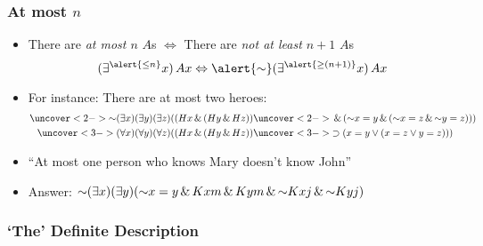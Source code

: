 \begin{frame}
    \frametitle{At most $n$}

\begin{itemize}
\item<1-> There are \emph{at most $n$} $A$s $\Leftrightarrow$ There are
\emph{not at least $n+1$} $A$s
\[
\qt{\exists^{\alert{\le n}}}{x}\, A\qv{x} \Leftrightarrow \alert{\lnot} \qt{\exists^{\alert{\ge(n+1)}}}{x} \, A\qv{x}
\]
\item<2-> For instance: There are at most two heroes:
\begin{align*}
\uncover<2->{\lnot \qt{\exists}{x}\qt{\exists}{y}\qt{\exists}{z}((H\qv{x} \land (H\qv{y} \land H\qv{z}))}
& \uncover<2->{\land (\lnot x =y \land (\lnot x = z \land \lnot y = z)) )}\\
\uncover<3->{\qt{\forall}{x}\qt{\forall}{y}\qt{\forall}{z}((H\qv{x} \land (H\qv{y} \land H\qv{z}))
} &\uncover<3->{\eif (x =y \lor ( x = z \lor y = z)) )}
\end{align*}


\item ``At most one person who knows Mary doesn't know John''

\item[] Answer: $\enot \qt{\exists}{x}\qt{\exists}{y}(\enot x = y \eand Kxm \eand Kym \eand \enot Kxj \eand \enot Kyj)$


\end{itemize}
\end{frame}



\subsubsection{`The' Definite Description}

